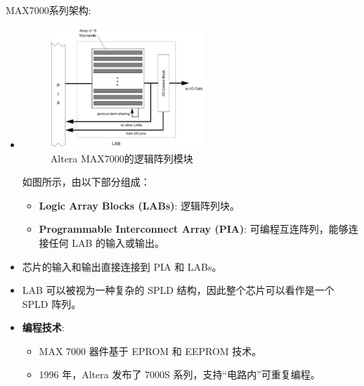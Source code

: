 \begin{frame}[allowframebreaks]{MAX7000系列架构}:

    \begin{itemize}
    \tightlist
    \item
    \begin{figure}
        \centering
        \includegraphics[width=0.55\textwidth,keepaspectratio]{img1/MAX7000.jpeg}
        \caption{Altera MAX7000的逻辑阵列模块}
    \end{figure}

    如图所示，由以下部分组成：
    \begin{itemize}
    \tightlist
    \item
        \textbf{Logic Array Blocks (LABs)}: 逻辑阵列块。
    \item
        \textbf{Programmable Interconnect Array (PIA)}:
        可编程互连阵列，能够连接任何 LAB 的输入或输出。
    \end{itemize}
    \item
    芯片的输入和输出直接连接到 PIA 和 LABs。
    \item
    LAB 可以被视为一种复杂的 SPLD 结构，因此整个芯片可以看作是一个 SPLD
    阵列。
    \item
    \textbf{编程技术}:

    \begin{itemize}
    \tightlist
    \item
        MAX 7000 器件基于 EPROM 和 EEPROM 技术。
    \item
        1996 年，Altera 发布了 7000S 系列，支持``电路内''可重复编程。
    \end{itemize}
    \end{itemize}
\end{frame}

